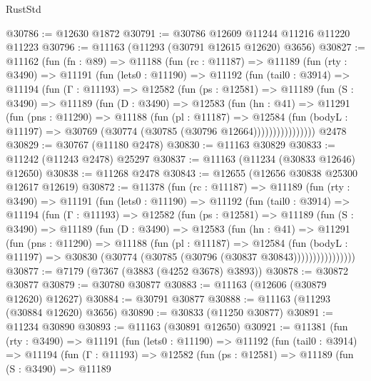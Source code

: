 \begin{lexlean}{RustStd}
\begin{coremodule}
@30786 := @12630 @1872
@30791 := @30786 @12609 @11244 @11216 @11220 @11223
@30796 := @11163 (@11293 (@30791 @12615 @12620) @3656)
@30827 := @11162
    (fun (fn : @89) =>
    @11188
      (fun (rc : @11187) =>
      @11189
        (fun (rty : @3490) =>
        @11191
          (fun (lets0 : @11190) =>
          @11192
            (fun (tail0 : @3914) =>
            @11194
              (fun (Γ : @11193) =>
              @12582
                (fun (ps : @12581) =>
                @11189
                  (fun (S : @3490) =>
                  @11189
                    (fun (D : @3490) =>
                    @12583
                      (fun (hn : @41) =>
                      @11291
                        (fun (pns : @11290) =>
                        @11188
                          (fun (pl : @11187) =>
                          @12584
                            (fun (bodyL : @11197) =>
                            @30769 (@30774 (@30785 (@30796 @12664))))))))))))))))
    @2478
@30829 := @30767 (@11180 @2478)
@30830 := @11163 @30829
@30833 := @11242 (@11243 @2478) @25297
@30837 := @11163 (@11234 (@30833 @12646) @12650)
@30838 := @11268 @2478
@30843 := @12655 (@12656 @30838 @25300 @12617 @12619)
@30872 := @11378
    (fun (rc : @11187) =>
    @11189
      (fun (rty : @3490) =>
      @11191
        (fun (lets0 : @11190) =>
        @11192
          (fun (tail0 : @3914) =>
          @11194
            (fun (Γ : @11193) =>
            @12582
              (fun (ps : @12581) =>
              @11189
                (fun (S : @3490) =>
                @11189
                  (fun (D : @3490) =>
                  @12583
                    (fun (hn : @41) =>
                    @11291
                      (fun (pns : @11290) =>
                      @11188
                        (fun (pl : @11187) =>
                        @12584
                          (fun (bodyL : @11197) =>
                          @30830 (@30774 (@30785 (@30796 (@30837 @30843))))))))))))))))
@30877 := @7179 (@7367 (@3883 (@4252 @3678) @3893))
@30878 := @30872 @30877
@30879 := @30780 @30877
@30883 := @11163 (@12606 (@30879 @12620) @12627)
@30884 := @30791 @30877
@30888 := @11163 (@11293 (@30884 @12620) @3656)
@30890 := @30833 (@11250 @30877)
@30891 := @11234 @30890
@30893 := @11163 (@30891 @12650)
@30921 := @11381
    (fun (rty : @3490) =>
    @11191
      (fun (lets0 : @11190) =>
      @11192
        (fun (tail0 : @3914) =>
        @11194
          (fun (Γ : @11193) =>
          @12582
            (fun (ps : @12581) =>
            @11189
              (fun (S : @3490) =>
              @11189

\end{coremodule}
\end{lexlean}
